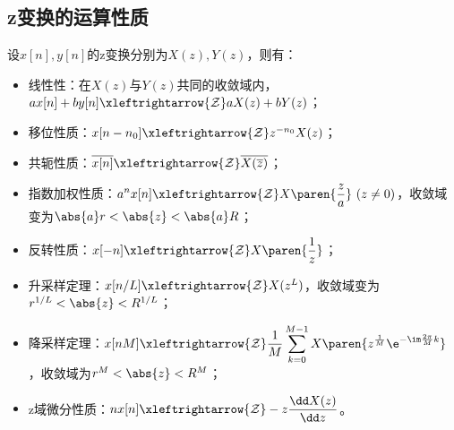 \subsection{z变换的运算性质}\label{sub:z_operation}
\begin{proposition}[z变换的运算性质]\label{prop:z_operation}
    设$x[n],y[n]$的z变换分别为$X(z),Y(z)$，则有：
    \begin{itemize}
        \item 线性性：在$X(z)$与$Y(z)$共同的收敛域内，$ax[n]+by[n]\xleftrightarrow{\mathcal{Z}}aX(z)+bY(z)$；
        \item 移位性质：$x[n-n_0]\xleftrightarrow{\mathcal{Z}}z^{-n_0}X(z)$；
        \item 共轭性质：$\overline{x[n]}\xleftrightarrow{\mathcal{Z}}\overline{X(\overline{z})}$；
        \item 指数加权性质：$\displaystyle a^{n}x[n]\xleftrightarrow{\mathcal{Z}}X\paren{\frac{z}{a}}\ (z\neq 0)$，收敛域变为$\abs{a}r<\abs{z}<\abs{a}R$；
        \item 反转性质：$\displaystyle x[-n]\xleftrightarrow{\mathcal{Z}}X\paren{\frac{1}{z}}$；
        \item 升采样定理：$x[n/L]\xleftrightarrow{\mathcal{Z}}X(z^L)$，收敛域变为$r^{1/L}<\abs{z}<R^{1/L}$；
        \item 降采样定理：$\displaystyle x[nM]\xleftrightarrow{\mathcal{Z}}\frac{1}{M}\sum_{k=0}^{M-1}X\paren{z^{\frac{1}{M}}\e^{-\im\frac{2\pi}{M}k}}$，收敛域为$r^M<\abs{z}<R^M$；
        \item z域微分性质：$\displaystyle nx[n]\xleftrightarrow{\mathcal{Z}}-z\frac{\dd X(z)}{\dd z}$。
    \end{itemize}
\end{proposition}
